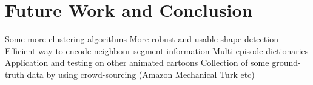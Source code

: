 \documentclass[10pt,twocolumn,letterpaper]{article}
\begin{document}
\section{Future Work and Conclusion}
Some more clustering algorithms
More robust and usable shape detection
Efficient way to encode neighbour segment information
Multi-episode dictionaries
Application and testing on other animated cartoons
Collection of some ground-truth data by using crowd-sourcing (Amazon
Mechanical Turk etc)


\clearpage

{\small


}
\end{document}
